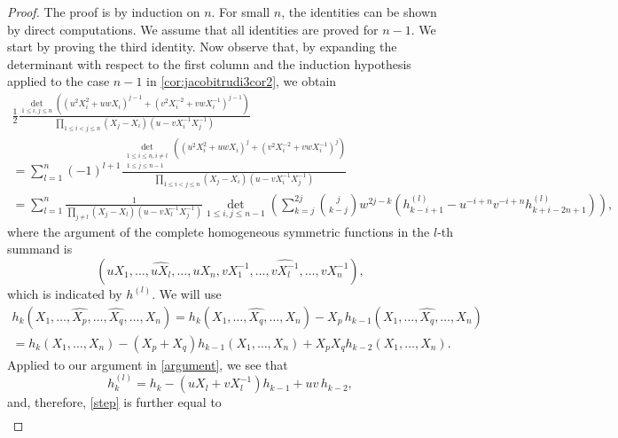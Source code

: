 \documentclass[10pt,a4paper]{amsart}
\begin{document}
	\begin{proof} 
		The proof is by induction on $n$. For small $n$, the identities can be shown by direct computations. We assume that 
		all identities are proved for $n-1$. 
		We start by proving the third identity. Now observe that, by expanding the determinant with respect to the first column and the induction 
		hypothesis applied to the case $n-1$ in \eqref{cor:jacobitrudi3cor2}, we obtain
		\begin{multline} 
			\label{step}
			\frac{1}{2}  \frac{\det_{1 \le i,j \le n} \left( \left(u^2 X_i^2 + u w X_i\right)^{j-1} + \left(v^2 X_i^{-2} + v w X_i^{-1}\right)^{j-1} \right)}
			{\prod_{1 \le i < j \le n} (X_j-X_i)(u - v X_i^{-1} X_j^{-1})} \\
			= \sum_{l=1}^n (-1)^{l+1} 
			\frac{\det_{\substack{1 \le i \le  n, i \not=l  \\ 1 \le j \le n-1}}
				\left( \left(u^2 X_i^2 + u w X_i\right)^{j} + \left(v^2 X_i^{-2} + v w X_i^{-1}\right)^{j} \right)}
			{\prod_{1 \le i < j \le n} (X_j-X_i)(u - v X_i^{-1} X_j^{-1})} \\
			= \sum_{l=1}^n \frac{1}{\prod_{j \not= l} (X_j-X_l)(u-v X_l^{-1} X_j^{-1})} 
			\det_{1 \le i, j \le n-1} \left( \sum_{k=j}^{2j} \binom{j}{k-j} w^{2j-k}  \left( h^{(l)}_{k-i+1} - u^{-i+n} v^{-i+n} h^{(l)}_{k+i-2n+1} \right) \right), 
		\end{multline} 
		where the argument of the complete homogeneous symmetric functions in the $l$-th summand is 
		\begin{equation}
			\label{argument}
			(u X_1,\ldots,\widehat{u X_l},\ldots,u X_n,v X_1^{-1},\ldots,\widehat{v X_l^{-1}},\ldots,v X_n^{-1}),
		\end{equation} 
		which is indicated by $h^{(l)}$. We will use 
		\begin{multline*} 
			h_k(X_1,\ldots,\widehat{X_p},\ldots,\widehat{X_q},\ldots,X_n) = h_k(X_1,\ldots,\widehat{X_q},\ldots,X_n) - X_p \, h_{k-1}(X_1,\ldots,\widehat{X_q},\ldots,X_n) \\
			= h_k(X_1,\ldots,X_n) - (X_p+X_q) h_{k-1}(X_1,\ldots,X_n) + X_p X_q h_{k-2}(X_1,\ldots,X_n).
		\end{multline*} 
		Applied to our argument in \eqref{argument}, we see that 
		\begin{equation*}
		h_k^{(l)}= h_k - (u X_l + v X_l^{-1}) h_{k-1} + u v\,  h_{k-2},
		\end{equation*}
		and, therefore, \eqref{step} is further equal to 
		\begin{multline}
			\label{eq:splittedhsum}

\end{multline}
\end{proof}
\end{document}
